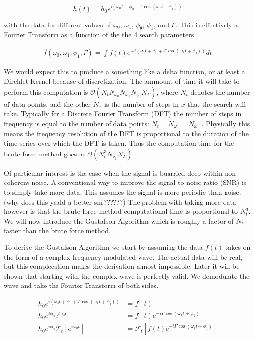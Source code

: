 \documentclass[onecolumn, groupedaddress, 10pt]{revtex4-1}
\begin{document}
\begin{equation}
h(t) = h_0 e^{i\left( \omega_0 t + \phi_0 + \Gamma \cos (\omega_1 t + \phi_1 ) \right)}
\end{equation}

with the data for different values of $\omega_0$, $\omega_1$, $\phi_0$, $\phi_1$, and $\Gamma$.  This is effectively a Fourier Transform as a function of the the 4 search parameters

\begin{align}
\hat{f}(\omega_0, \omega_1, \phi_1, \Gamma) = \int f(t) e^{-i\left( \omega_0 t + \phi_0 + \Gamma \cos (\omega_1 t + \phi_1 ) \right)} dt
\end{align}

We would expect this to produce a something like a delta function, or at least a Dirchlet Kernel because of discretization.  The ammount of time it will take to perform this computation is $\mathcal{O} (N_tN_{\omega_0}N_{\omega_1}N_{\phi_1}N_\Gamma)$, where $N_t$ denotes the number of data points, and the other $N_x$ is the number of steps in $x$ that the search will take.  Typically for a Discrete Fourier Transform (DFT) the number of steps in frequency is equal to the number of data points: $N_t=N_{\omega_0}=N_{\omega_1}$ \cite{}.  Physically this means the frequency resolution of the DFT is proportional to the duration of the time series over which the DFT is taken.  Thus the computation time for the brute force method goes as $\mathcal{O} (N_t^3N_{\phi_1}N_\Gamma)$.  

Of particular interest is the case when the signal is buarried deep within non-coherent noise.  A conventional way to improve the signal to noise ratio (SNR) is to simply take more data.  This assumes the signal is more periodic than noise.  (why does this yeald a better snr??????)  The problem with taking more data however is that the brute force method computational time is proportional to $N_t^3$.  We will now introduce the Gustafson Algorithm which is roughly a factor of $N_t$ faster than the brute force method.

To derive the Gustafson Algorithm we start by assuming the data $f(t)$ takes on the form of a complex frequency modulated wave.  The actual data will be real, but this complecation makes the derivation almost impossible.  Later it will be shown that starting with the complex wave is perfectly valid.  We demodulate the wave and take the Fourier Transform of both sides.

\begin{align}
h_0 e^{i\left( \omega_0 t + \phi_0 + \Gamma \cos (\omega_1 t + \phi_1 ) \right)} &= f(t) 												\\
h_0 e^{i\phi_0} e^{i\omega_0 t} &= f(t) e^{-i\Gamma \cos (\omega_1 t + \phi_1)}															\\
h_0 e^{i\phi_0} \mathcal{F}_t \left[ e^{i\omega_0 t} \right] &= \mathcal{F}_t \left[ f(t) e^{-i\Gamma \cos (\omega_1 t + \phi_1)} \right]
\end{align}
\end{document}
